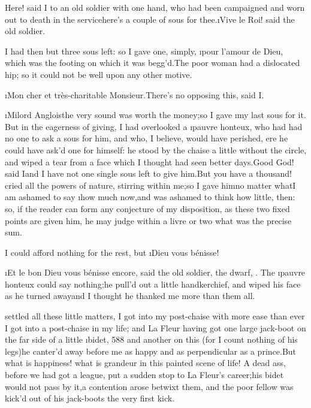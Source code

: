 \documentclass[twoside]{article}
\begin{document}
\tsk Here! said I to an old soldier with one hand, who had been campaigned
and worn out to death in the service\tsk here’s a couple of sous for
thee.\tsk \i{Vive le Roi}! said the old soldier.

I had then but three sous left: so I gave one, simply, \i{pour l’amour de
Dieu}, which was the footing on which it was begg’d.\tsk The poor woman had a
dislocated hip; so it could not be well upon any other motive.

\i{Mon cher et très-charitable Monsieur}.\tsk There’s no opposing this, said I.

\i{Milord Anglois}\tsk the very sound was worth the money;\tsk so I gave \i{my last
sous for it}.  But in the eagerness of giving, I had overlooked a \i{pauvre
honteux}, who had had no one to ask a sous for him, and who, I believe,
would have perished, ere he could have ask’d one for himself: he stood by
the chaise a little without the circle, and wiped a tear from a face
which I thought had seen better days.\tsk Good God! said I\tsk and I have not one
single sous left to give him.\tsk But you have a thousand! cried all the
powers of nature, stirring within me;\tsk so I gave him\tsk no matter what\tsk I am
ashamed to say \i{how much} now,\tsk and was ashamed to think how little, then:
so, if the reader can form any conjecture of my disposition, as these two
fixed points are given him, he may judge within a livre or two what was
the precise sum.

I could afford nothing for the rest, but \i{Dieu vous bénisse}!

\tsk \i{Et le bon Dieu vous bénisse encore}, said the old soldier, the dwarf,
\etc.  The \i{pauvre honteux} could say nothing;\tsk he pull’d out a little
handkerchief, and wiped his face as he turned away\tsk and I thought he
thanked me more than them all.






 settled all these little matters, I got into my post-chaise with
more ease than ever I got into a post-chaise in my life; and La Fleur
having got one large jack-boot on the far side of a little \i{bidet}, {588}
and another on this (for I count nothing of his legs)\tsk he canter’d away
before me as happy and as perpendicular as a prince.\tsk But what is
happiness! what is grandeur in this painted scene of life!  A dead ass,
before we had got a league, put a sudden stop to La Fleur’s career;\tsk his
bidet would not pass by it,\tsk a contention arose betwixt them, and the poor
fellow was kick’d out of his jack-boots the very first kick.
\end{document}
